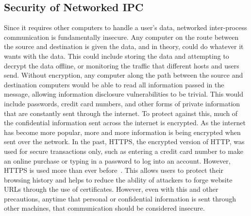 \subsection{Security of Networked IPC}
\label{sec:networkedIPCSecurity}
Since it requires other computers to handle a user's data, networked inter-process communication is fundamentally insecure.  Any computer on the route between the source and destination is given the data, and in theory, could do whatever it wants with the data.  This could include storing the data and attempting to decrypt the data offline, or monitoring the traffic that different hosts and users send.  Without encryption, any computer along the path between the source and destination computers would be able to read all information passed in the message, allowing information disclosure vulnerabilities to be trivial.  This would include passwords, credit card numbers, and other forms of private information that are constantly sent through the internet.  To protect against this, much of the confidential information sent across the internet is encrypted.  As the internet has become more popular, more and more information is being encrypted when sent over the network.  In the past, HTTPS, the encrypted version of HTTP, was used for secure transactions only, such as entering a credit card number to make an online purchase or typing in a password to log into an account.  However, HTTPS is used more than ever before~\cite{google_transparency_report}.  This allows users to protect their browsing history and helps to reduce the ability of attackers to forge website URLs through the use of certificates.  However, even with this and other precautions, anytime that personal or confidential information is sent through other machines, that communication should be considered insecure.

